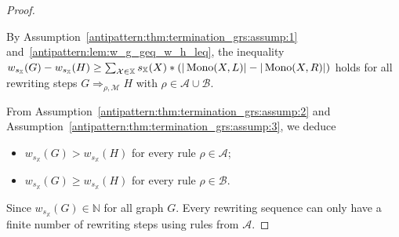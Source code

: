 
\begin{proof} 
    \label{antipattern:proof:thm:termination_grs}
    
    By Assumption~\eqref{antipattern:thm:termination_grs:assump:1} and~\autoref{antipattern:lem:w_g_geq_w_h_leq}, the inequality \(
        w_{s_\mathbb{X}}(G) - w_{s_\mathbb{X}}(H) 
        \geq 
        \sum_{\mathcal{X} \in \mathbb{X}}^{}s_\mathbb{X}(X) * \left( 
            |\operatorname{Mono}(X,L)| -
            |\operatorname{Mono}(X,R)|
            \right)
    \) holds for all rewriting steps $G \Rightarrow_{\rho, \mathcal{M}} H$  with $\rho \in \mathcal{A} \cup \mathcal{B}$.
    
    \noindent From Assumption~\eqref{antipattern:thm:termination_grs:assump:2} and Assumption~\eqref{antipattern:thm:termination_grs:assump:3}, we deduce 
    \begin{itemize}
        \item \( w_{s_\mathbb{X}}(G) > w_{s_\mathbb{X}}(H) \) for every rule \(\rho \in \mathcal{A}\);
        \item  \( w_{s_\mathbb{X}}(G) \geq w_{s_\mathbb{X}}(H) \) for every rule \(\rho \in \mathcal{B}\).
    \end{itemize}
    Since $w_{s_\mathbb{X}}(G) \in \mathbb{N}$ for all graph $G$. Every rewriting sequence can only have a finite number of rewriting steps using rules from $\mathcal{A}$.
\end{proof} 